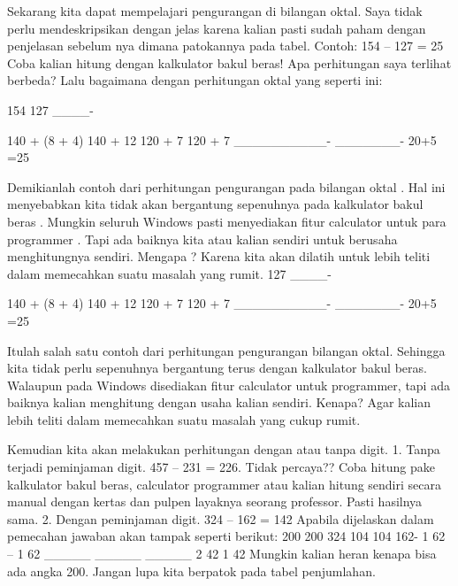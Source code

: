 Sekarang kita dapat mempelajari pengurangan di bilangan oktal. Saya tidak perlu mendeskripsikan dengan jelas karena kalian pasti sudah paham dengan penjelasan sebelum nya dimana patokannya pada tabel.
Contoh:
154 – 127 = 25
Coba kalian hitung dengan kalkulator bakul beras! Apa perhitungan saya terlihat berbeda?
Lalu bagaimana dengan perhitungan oktal yang seperti ini:

154
127
____-
 
140 + (8 + 4)                        140 + 12
120 +        7                           120 +   7
__________-                    _______-
                                                20+5
                                                =25

Demikianlah contoh dari perhitungan pengurangan pada bilangan oktal . Hal ini menyebabkan kita tidak akan bergantung sepenuhnya pada kalkulator bakul beras . Mungkin seluruh Windows pasti menyediakan fitur calculator untuk para programmer . Tapi ada baiknya kita atau kalian sendiri untuk berusaha menghitungnya sendiri. Mengapa ? Karena kita akan dilatih untuk lebih teliti dalam memecahkan suatu masalah yang rumit. 
127
____-
 
140 + (8 + 4)                        140 + 12
120 +    7                           120 +   7
__________-                    _______-
                                                20+5
                                                =25

Itulah salah satu contoh dari perhitungan pengurangan bilangan oktal. Sehingga kita tidak perlu sepenuhnya bergantung terus dengan kalkulator bakul beras. Walaupun pada Windows disediakan fitur calculator untuk programmer, tapi ada baiknya kalian menghitung dengan usaha kalian sendiri. Kenapa? Agar kalian lebih teliti dalam memecahkan suatu masalah yang cukup rumit.
 
Kemudian kita akan melakukan perhitungan dengan atau tanpa digit.  
1.	Tanpa terjadi peminjaman digit.
457 – 231 = 226. Tidak percaya?? Coba hitung pake kalkulator bakul beras, calculator programmer atau kalian hitung sendiri secara manual dengan kertas dan pulpen layaknya seorang professor. Pasti hasilnya sama.
2.	Dengan peminjaman digit.
324 – 162 = 142
Apabila dijelaskan dalam pemecahan jawaban akan tampak seperti berikut:
                                200                                         200
324                           104                                          104
162-                       1  62 –                                    1   62
_____                   _____                                   _____
    2                              42                                       1   42
Mungkin kalian heran kenapa bisa ada angka 200. Jangan lupa kita berpatok pada tabel penjumlahan.
	
